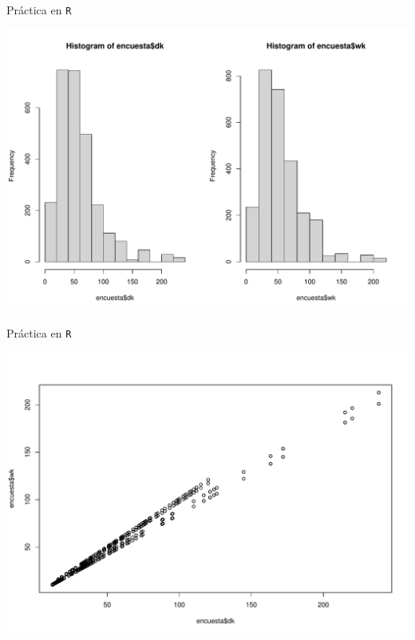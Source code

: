 \documentclass[
  english,
  ignorenonframetext,
]{beamer}
\newenvironment{Shaded}{\begin{snugshade}}{\end{snugshade}}
\newcommand{\AttributeTok}[1]{\textcolor[rgb]{0.77,0.63,0.00}{#1}}
\newcommand{\DecValTok}[1]{\textcolor[rgb]{0.00,0.00,0.81}{#1}}
\newcommand{\FunctionTok}[1]{\textcolor[rgb]{0.00,0.00,0.00}{#1}}
\newcommand{\NormalTok}[1]{#1}
\newcommand{\SpecialCharTok}[1]{\textcolor[rgb]{0.00,0.00,0.00}{#1}}
\begin{document}
\begin{frame}[fragile]{Práctica en \texttt{R}}
\protect\hypertarget{pruxe1ctica-en-r-13}{}
\begin{Shaded}
\end{Shaded}

\includegraphics{0muestra_files/figure-beamer/unnamed-chunk-14-1.pdf}
\end{frame}

\begin{frame}[fragile]{Práctica en \texttt{R}}
\protect\hypertarget{pruxe1ctica-en-r-14}{}
\begin{Shaded}
\end{Shaded}

\includegraphics{0muestra_files/figure-beamer/unnamed-chunk-15-1.pdf}
\end{frame}
\end{document}
